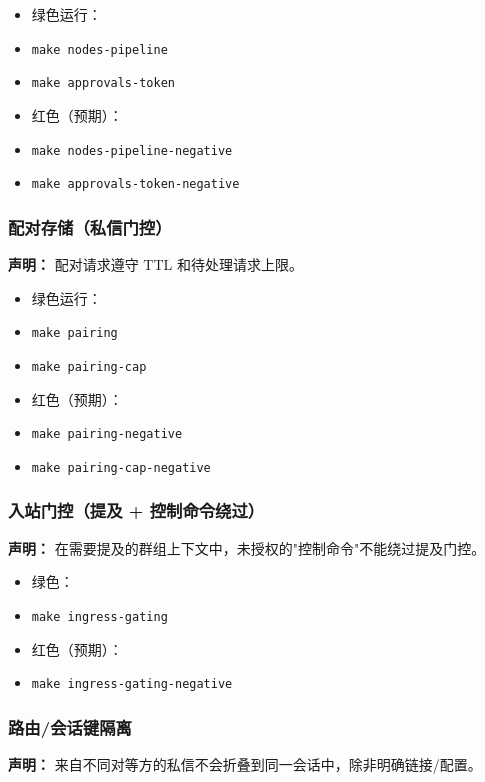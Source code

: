 \begin{itemize}
  \item 绿色运行：
  \item \texttt{make nodes-pipeline}
  \item \texttt{make approvals-token}
  \item 红色（预期）：
  \item \texttt{make nodes-pipeline-negative}
  \item \texttt{make approvals-token-negative}
\end{itemize}


\subsubsection{配对存储（私信门控）}


\textbf{声明：} 配对请求遵守 TTL 和待处理请求上限。

\begin{itemize}
  \item 绿色运行：
  \item \texttt{make pairing}
  \item \texttt{make pairing-cap}
  \item 红色（预期）：
  \item \texttt{make pairing-negative}
  \item \texttt{make pairing-cap-negative}
\end{itemize}


\subsubsection{入站门控（提及 + 控制命令绕过）}


\textbf{声明：} 在需要提及的群组上下文中，未授权的"控制命令"不能绕过提及门控。

\begin{itemize}
  \item 绿色：
  \item \texttt{make ingress-gating}
  \item 红色（预期）：
  \item \texttt{make ingress-gating-negative}
\end{itemize}


\subsubsection{路由/会话键隔离}


\textbf{声明：} 来自不同对等方的私信不会折叠到同一会话中，除非明确链接/配置。

